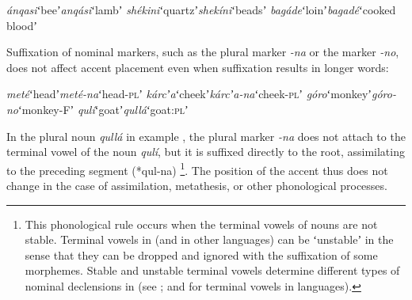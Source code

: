 \documentclass[output=paper]{LSP/langsci}
\begin{document}
\begin{exe}
	\ex \begin{xlist}
	\ex \textit{ánqasi}\hspace{8mm}ʻbeeʼ\hspace{11mm}\textit{anqási}\hspace{6mm}ʻlambʼ
    \ex \textit{shékini}\hspace{8mm}ʻquartzʼ\hspace{6mm}\textit{shekíni}\hspace{5mm}ʻbeadsʼ
    \ex \textit{bagáde}\hspace{8mm}ʻloinʼ\hspace{10mm}\textit{bagadé}\hspace{5mm}ʻcooked bloodʼ
\end{xlist} \label{ex:Petrollino:minimalpairs2}
\end{exe}
Suffixation of nominal markers, such as the plural marker \textit{-na} or the   marker \textit{-no}, does not affect accent placement even when suffixation results in longer words:
\begin{exe} 
	\ex \label{ex:Petrollino:nominflections} \begin{xlist}
	\ex \textit{meté}\hspace{12mm}ʻheadʼ\hspace{9mm}\textit{meté-na}\hspace{4mm}ʻhead-\textsc{pl}ʼ
    \ex \textit{kárcʼa}\hspace{10mm}ʻcheekʼ\hspace{8mm}\textit{kárcʼa-na}\hspace{2mm}ʻcheek-\textsc{pl}ʼ
    \ex \textit{góro}\hspace{13mm}ʻmonkeyʼ\hspace{4mm}\textit{góro-no}\hspace{5mm}ʻmonkey-Fʼ
    \ex \textit{qulí}\hspace{13mm}ʻgoatʼ\hspace{10mm}\textit{qullá}\hspace{9mm}ʻgoat:\textsc{pl}ʼ\label{ex:Petrollino:qullá}
\end{xlist}
\end{exe}
In the plural noun \textit{qullá} in example , the plural marker \textit{-na} does not attach to the terminal vowel of the noun \textit{qulí}, but it is suffixed directly to the root, assimilating to the preceding  segment (*qul-na) \footnote{This phonological rule occurs when the terminal vowels of nouns are not stable. Terminal vowels in  (and in other  languages) can be ʻunstableʼ in the sense that they can be dropped and ignored with the suffixation of some morphemes. Stable and unstable terminal vowels determine different types of nominal declensions in  (see \citealt[73-77]{Petrollino2016}; \citealt{Hayward1987} and \citealt{Azeb2012} for terminal vowels in  languages).}. The position of the accent thus does not change in the case of assimilation, metathesis, or other phonological processes. \newline
\end{document}
